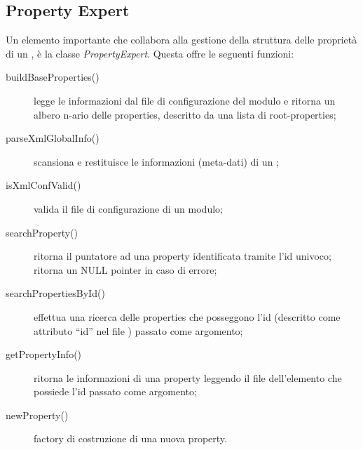 \subsection*{Property Expert}
Un elemento importante che collabora alla gestione della struttura delle proprietà di un \plugin{}, è la classe \emph{PropertyExpert}. Questa offre le seguenti funzioni:
\begin{description}
\item[buildBaseProperties()] legge le informazioni dal file di configurazione del modulo e ritorna un albero n-ario delle properties, descritto da una lista di root-properties;

\item[parseXmlGlobalInfo()] scansiona e restituisce le informazioni (meta-dati) di un \plugin{};

\item[isXmlConfValid()] valida il file di configurazione di un modulo;

\item[searchProperty()] ritorna il puntatore ad una property identificata tramite l'id univoco; ritorna un NULL pointer in caso di errore;

\item[searchPropertiesById()] effettua una ricerca delle properties che posseggono l'id (descritto come attributo ``id'' nel file \xml{}) passato come argomento;

\item[getPropertyInfo()] ritorna le informazioni di una property leggendo il file \xml{} dell'elemento che possiede l'id passato come argomento;

\item[newProperty()] factory di costruzione di una nuova property.

\end{description}
